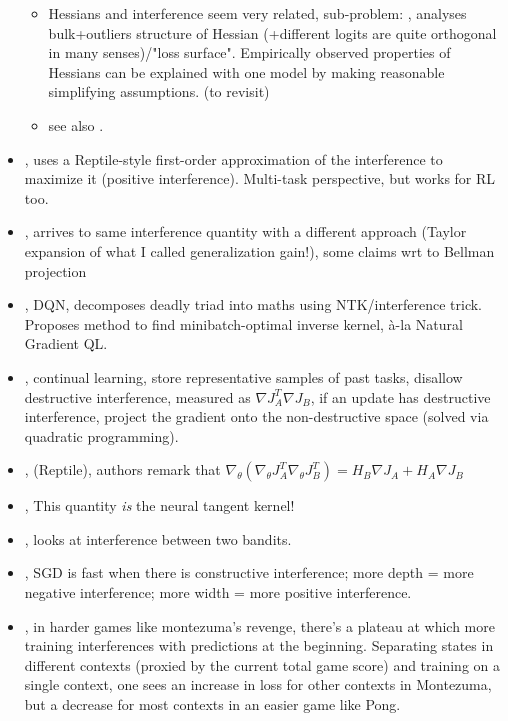 \begin{itemize}
    \begin{itemize}
        \item Hessians and interference seem very related, sub-problem: \cite{fort2019emergent}, analyses bulk+outliers structure of Hessian (+different logits are quite orthogonal in many senses)/"loss surface". Empirically observed properties of Hessians can be explained with one model by making reasonable simplifying assumptions. (to revisit)
        \item see also \cite{papyan2019measurements}.
    \end{itemize}
   \item \cite{riemer2018learning}, uses a Reptile-style first-order approximation of the interference to maximize it (positive interference). Multi-task perspective, but works for RL too.
   \item \cite{liu2019toward}, arrives to same interference quantity with a different approach (Taylor expansion of what I called generalization gain!), some claims wrt to Bellman projection
    \item \citet{achiam2019towards}, DQN, decomposes deadly triad into maths using NTK/interference trick. Proposes method to find minibatch-optimal inverse kernel, à-la Natural Gradient QL.
    \item \citet{lopez2017gradient}, continual learning, store representative samples of past tasks, disallow destructive interference, measured as $\nabla J_A^T\nabla J_B$, if an update has destructive interference, project the gradient onto the non-destructive space (solved via quadratic programming).
    \item \citet{nichol2018first}, (Reptile), authors remark that $\nabla_\theta(\nabla_\theta J_A^T\nabla_\theta J_B^T) = H_B\nabla J_A+H_A\nabla J_B$
    \item \citet{jacot2018neural}, This quantity \emph{is} the neural tangent kernel!
    \item \citet{schaul2019ray}, looks at interference between two bandits.
    \item \citet{sankararaman2019impact}, SGD is fast when there is constructive interference; more depth = more negative interference; more width = more positive interference.
    \item \citet{fedus2020catastrophic}, in harder games like montezuma's revenge, there's a plateau at which more training interferences with predictions at the beginning. Separating states in different contexts (proxied by the current total game score) and training on a single context, one sees an increase in loss for other contexts in Montezuma, but a decrease for most contexts in an easier game like Pong.

\end{itemize}
